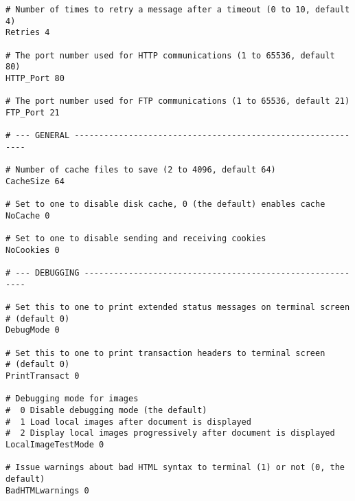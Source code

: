 \begin{verbatim}
# Number of times to retry a message after a timeout (0 to 10, default 4)
Retries 4

# The port number used for HTTP communications (1 to 65536, default 80)
HTTP_Port 80

# The port number used for FTP communications (1 to 65536, default 21)
FTP_Port 21

# --- GENERAL ------------------------------------------------------------

# Number of cache files to save (2 to 4096, default 64)
CacheSize 64

# Set to one to disable disk cache, 0 (the default) enables cache
NoCache 0

# Set to one to disable sending and receiving cookies
NoCookies 0

# --- DEBUGGING ----------------------------------------------------------

# Set this to one to print extended status messages on terminal screen
# (default 0)
DebugMode 0

# Set this to one to print transaction headers to terminal screen
# (default 0)
PrintTransact 0

# Debugging mode for images
#  0 Disable debugging mode (the default)
#  1 Load local images after document is displayed
#  2 Display local images progressively after document is displayed
LocalImageTestMode 0

# Issue warnings about bad HTML syntax to terminal (1) or not (0, the default)
BadHTMLwarnings 0
\end{verbatim}



